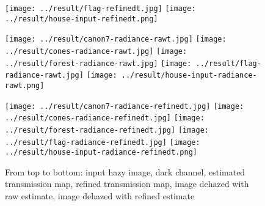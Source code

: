 \documentclass{article}
\begin{document}
\begin{figure}[H]
\begin{minipage}[b]{\linewidth}
        \texttt{[image: ../result/flag-refinedt.jpg]}
        \texttt{[image: ../result/house-input-refinedt.png]}
    \end{minipage}
    \begin{minipage}[b]{\linewidth}
        \centering
        \texttt{[image: ../result/canon7-radiance-rawt.jpg]}
        \texttt{[image: ../result/cones-radiance-rawt.jpg]}
        \texttt{[image: ../result/forest-radiance-rawt.jpg]}
        \texttt{[image: ../result/flag-radiance-rawt.jpg]}
        \texttt{[image: ../result/house-input-radiance-rawt.png]}
    \end{minipage}
    \begin{minipage}[b]{\linewidth}
        \centering
        \texttt{[image: ../result/canon7-radiance-refinedt.jpg]}
        \texttt{[image: ../result/cones-radiance-refinedt.jpg]}
        \texttt{[image: ../result/forest-radiance-refinedt.jpg]}
        \texttt{[image: ../result/flag-radiance-refinedt.jpg]}
        \texttt{[image: ../result/house-input-radiance-refinedt.png]}
    \end{minipage}
    \caption{From top to bottom: input hazy image, dark channel, estimated transmission map, refined transmission map, image dehazed with raw estimate, image dehazed with refined estimate}
    \label{fig:result1}
\end{figure}
\end{document}
